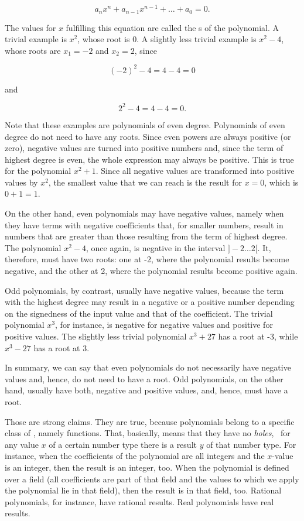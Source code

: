 \documentclass[tikz]{scrreprt}
\begin{document}
\begin{equation}
a_nx^n + a_{n-1}x^{n-1} + \dots + a_0 = 0.
\end{equation}

The values for $x$ fulfilling this equation
are called the s of the polynomial.
A trivial example is $x^2$, whose root is 0.
A slightly less trivial example is $x^2 - 4$,
whose roots are $x_1 = -2$ and $x_2 = 2$, since

\[
(-2)^2 - 4 = 4 - 4 = 0
\]

and

\[
2^2 - 4 = 4 - 4 = 0.
\]

Note that these examples are polynomials of even degree.
Polynomials of even degree do not need to have any roots.
Since even powers are always positive (or zero), negative values
are turned into positive numbers and, since the term of highest
degree is even, the whole expression may always be positive.
This is true for the polynomial $x^2 + 1$. Since all negative values
are transformed into positive values by $x^2$, the smallest value
that we can reach is the result for $x=0$, which is $0+1=1$.

On the other hand, even polynomials may have negative values,
namely when they have terms with negative coefficients that, 
for smaller numbers,
result in numbers that are greater than those resulting from
the term of highest degree. 
The polynomial $x^2 - 4$, once again, is negative
in the interval $]-2\dots 2[$. It, therefore, must have two roots:
one at -2, where the polynomial results become negative, and the other at 2,
where the polynomial results become positive again.

Odd polynomials, by contrast, usually have negative values, because
the term with the highest degree may result in a negative or a
positive number depending on the signedness of the input value
and that of the coefficient.
The trivial polynomial $x^3$, for instance, is negative for
negative values and positive for positive values. The slightly
less trivial polynomial $x^3 + 27$ has a root at -3, while
$x^3 - 27$ has a root at 3.

In summary, we can say that even polynomials do not necessarily
have negative values and, hence, do not need to have a root.
Odd polynomials, on the other hand, usually have both, negative
and positive values, and, hence, must have a root.

Those are strong claims. They are true, because polynomials
belong to a specific class of , 
namely  functions.
That, basically, means that they have no \emph{holes}, \ie\
for any value $x$ of a certain number type there is a result $y$
of that number type. For instance, when the coefficients of the
polynomial are all integers and the $x$-value is an integer,
then the result is an integer, too. When the polynomial is defined
over a field (all coefficients are part of that field and
the values to which we apply the polynomial lie in that field),
then the result is in that field, too. Rational polynomials,
for instance, have rational results. 
Real polynomials have real results.
\end{document}
